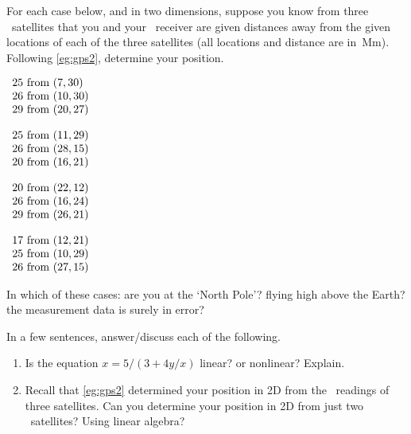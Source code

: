 \begin{exercise} \label{ex:gps2} 
For each case below, and in two dimensions, suppose you know from three \gps\ satellites that you and your \gps\ receiver are given distances away from the given locations of each of the three satellites (all locations and distance are in~Mm).  
Following \autoref{eg:gps2}, determine your position.  
\begin{Parts}
\item \(\begin{array}{r@{\text{ from }}l}
25&(7,30)\\26&(10,30)\\29&(20,27)
\end{array}\)

\item \(\begin{array}{r@{\text{ from }}l}
25&(11,29)\\26&(28,15)\\20&(16,21)
\end{array}\)

\item \(\begin{array}{r@{\text{ from }}l}
20&(22,12)\\26&(16,24)\\29&(26,21)
\end{array}\)

\item \(\begin{array}{r@{\text{ from }}l}
17&(12,21)\\25&(10,29)\\26&(27,15)
\end{array}\)

\end{Parts}
In which of these cases: are you at the `North Pole'?  flying high above the Earth?  the measurement data is surely in error?
\end{exercise}



\begin{exercise}  
In a few sentences, answer\slash discuss each of the following.
\begin{enumerate}
\item Is the equation \(x=5/(3+4y/x)\) linear? or nonlinear? Explain.

\item Recall that \autoref{eg:gps2} determined your position in 2D from the \gps\ readings of three satellites.  Can you determine your position in 2D from just two \gps\ satellites?  Using linear algebra?

\end{enumerate}
\end{exercise}

\begin{comment}%
why, what caused X?
how did X occur?
what-if? what-if-not?
how does X compare with Y?
what is the evidence for X?
why is X important?
\end{comment}










